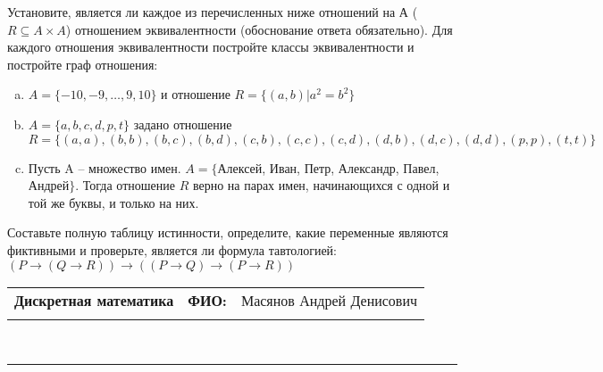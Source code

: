 \documentclass[10pt]{exam}
\newcommand{\class}{Дискретная математика}
\newcommand{\examdate}{}
\begin{document}
\begin{questions}
\question
Установите, является ли каждое из перечисленных ниже отношений на А ($R \subseteq A \times A$) отношением эквивалентности (обоснование ответа обязательно). Для каждого отношения эквивалентности постройте классы 
эквивалентности и постройте граф отношения:
\begin{enumerate} [a)]\setcounter{enumi}{0}
\item $A = \{-10, -9, … , 9, 10\}$ и отношение $R = \{(a,b)|a^{2} = b^{2}\}$
\item $A = \{a, b, c, d, p, t\}$ задано отношение $R = \{(a, a), (b, b), (b, c), (b, d), (c, b), (c, c), (c, d), (d, b), (d, c), (d, d), (p,p), (t,t)\}$
\item Пусть A – множество имен. $A = \{ $Алексей, Иван, Петр, Александр, Павел, Андрей$ \}$. Тогда отношение $R$ верно на парах имен, начинающихся с одной и той же буквы, и только на них.
\end{enumerate}\question Составьте полную таблицу истинности, определите, какие переменные являются фиктивными и проверьте, является ли формула тавтологией:
$(P \rightarrow (Q \rightarrow R)) \rightarrow ((P \rightarrow Q) \rightarrow (P \rightarrow R))$

\end{questions}
\newpage
\begin{flushright}
\begin{tabular}{p{2.8in} r l}
\textbf{\class} & \textbf{ФИО:} &Масянов Андрей Денисович
\\

\textbf{\examdate} &&\\
\end{tabular}\\
\end{flushright}
\rule[1ex]{\textwidth}{.1pt}
\end{document}
